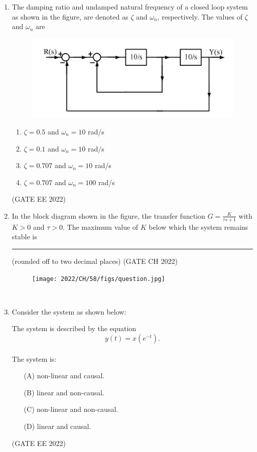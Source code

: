 \begin{enumerate}[label=\thechapter.\arabic*,ref=\thechapter.\theenumi]

\item The damping ratio and undamped natural frequency of a closed loop system as
shown in the figure, are denoted as $\zeta$ and $\omega_n$, respectively. The values of $\zeta$ and $\omega_n$
are 
\begin{figure}[!ht]
\centering
\begin{center}
\includegraphics[width=\columnwidth]{2022/EE/39/figs/question.jpg}
\end{center}
\end{figure}
\begin{enumerate}
    \item $\zeta = 0.5$ and $\omega_n = 10$ rad/s
    \item $\zeta = 0.1$ and $\omega_n = 10$ rad/s
    \item $\zeta = 0.707$ and $\omega_n = 10$ rad/s
    \item $\zeta = 0.707$ and $\omega_n = 100$ rad/s
\end{enumerate}
\hfill(GATE EE 2022)
\solution

\newpage
\item In the block diagram shown in the figure, the transfer function $G=\frac{K}{\tau s+1}$ with $K>0$ and $\tau>0$. The maximum value of $K$ below which the system remains stable is \rule{1cm}{0.15mm}(rounded off to two decimal places) \hfill (GATE CH 2022) 
\begin{figure}[htbp] 
\texttt{[image: 2022/CH/58/figs/question.jpg]} 
\end{figure}\\ 
\solution 
 
\newpage
\item Consider the system as shown below:


The system is described by the equation
\[ y(t) = x(e^{-t}). \]\\
The system is:
\begin{itemize}
    \item[(A)] non-linear and causal.
    \item[(B)] linear and non-causal.
    \item[(C)] non-linear and non-causal.
    \item[(D)] linear and causal.
\end{itemize}
\hfill(GATE EE 2022)
\newpage
\end{enumerate}
